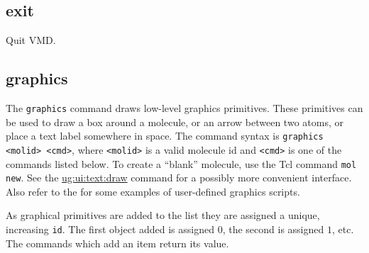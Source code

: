 \subsection{exit}
Quit VMD.

\subsection{graphics}
\label{ug:ui:text:graphics}


The {\tt graphics} command draws low-level graphics primitives.
These primitives can be used to draw a box around a molecule, or an
arrow between two atoms, or place a text label somewhere in space.
The command syntax is {\tt graphics <molid> <cmd>},
where {\tt <molid>} is a valid molecule id and {\tt <cmd>} is one of the
commands listed below.  To create a ``blank'' molecule, use the Tcl command 
{\tt mol new}.  
See the 
\hyperref{draw}{draw [\S~}{]}{ug:ui:text:draw} command for a 
possibly more convenient interface.  Also refer to the 
for some examples of user-defined graphics scripts.


As graphical primitives are added to the list they are assigned a unique,
increasing {\tt id}.  The first object added is assigned $0$, the second
is assigned $1$, etc.  The commands which add an item return its value.

